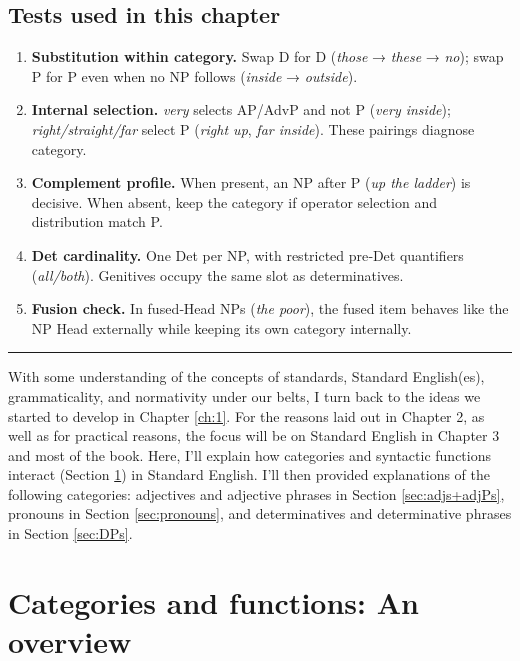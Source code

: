 \subsection*{Tests used in this chapter}\label{subsec:cat-func-tests}
\begin{enumerate}
  \item \textbf{Substitution within category.} Swap D for D (\textit{those} → \textit{these} → \textit{no}); swap P for P even when no NP follows (\textit{inside} → \textit{outside}). 
  \item \textbf{Internal selection.} \textit{very} selects AP/AdvP and not P (\ast\textit{very inside}); \textit{right/straight/far} select P (\textit{right up}, \textit{far inside}). These pairings diagnose category. 
  \item \textbf{Complement profile.} When present, an NP after P (\textit{up the ladder}) is decisive. When absent, keep the category if operator selection and distribution match P. 
  \item \textbf{Det cardinality.} One Det per NP, with restricted pre‑Det quantifiers (\textit{all/both}). Genitives occupy the same slot as determinatives. 
  \item \textbf{Fusion check.} In fused‑Head NPs (\textit{the poor}), the fused item behaves like the NP Head externally while keeping its own category internally. 
\end{enumerate}

\noindent\rule{\textwidth}{0.4pt}

\clearpage

\noindent With some understanding of the concepts of standards, Standard English(es), grammaticality, and normativity under our belts, I turn back to the ideas we started to develop in Chapter \ref{ch:1}. For the reasons laid out in Chapter 2, as well as for practical reasons, the focus will be on Standard English in Chapter 3 and most of the book. Here, I'll explain how categories and syntactic functions interact (Section \ref{sec:cat-funct}) in Standard English. I'll then provided explanations of the following categories: adjectives and adjective phrases in Section \ref{sec:adjs+adjPs}, pronouns in Section \ref{sec:pronouns}, and determinatives and determinative phrases in Section \ref{sec:DPs}.

\section{Categories and functions: An overview}\label{sec:cat-funct}
